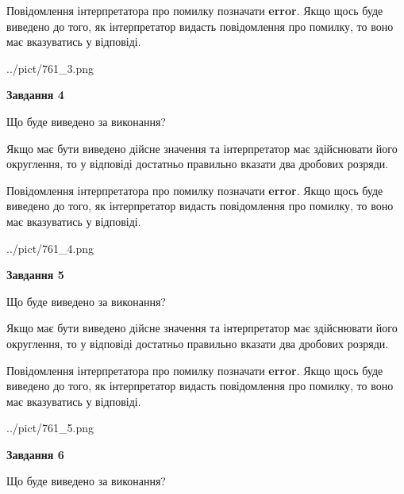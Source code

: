 \documentclass[12pt, ukrainian]{article}
\begin{document}
{\begin {Large}
Повідомлення інтерпретатора про помилку позначати \textbf{error}.
Якщо щось буде виведено до того, як інтерпретатор видасть повідомлення про помилку, 
то воно має вказуватись у відповіді. \par

\begin{center}
	{../pict/761_3.png}
\end{center}
\newpage

{\begin {center}\textbf{Завдання 4}\end {center}}\par
Що буде виведено за виконання? \par

Якщо має бути виведено дійсне значення та інтерпретатор має здійснювати його округлення, 
то у відповіді достатньо правильно вказати два дробових розряди.

Повідомлення інтерпретатора про помилку позначати \textbf{error}.
Якщо щось буде виведено до того, як інтерпретатор видасть повідомлення про помилку, 
то воно має вказуватись у відповіді. \par

\begin{center}
	{../pict/761_4.png}
\end{center}
\newpage

{\begin {center}\textbf{Завдання 5}\end {center}}\par
Що буде виведено за виконання? \par

Якщо має бути виведено дійсне значення та інтерпретатор має здійснювати його округлення, 
то у відповіді достатньо правильно вказати два дробових розряди.

Повідомлення інтерпретатора про помилку позначати \textbf{error}.
Якщо щось буде виведено до того, як інтерпретатор видасть повідомлення про помилку, 
то воно має вказуватись у відповіді. \par

\begin{center}
	{../pict/761_5.png}
\end{center}
\newpage

{\begin {center}\textbf{Завдання 6}\end {center}}\par
Що буде виведено за виконання? \par


\end{Large}}
\end{document}
